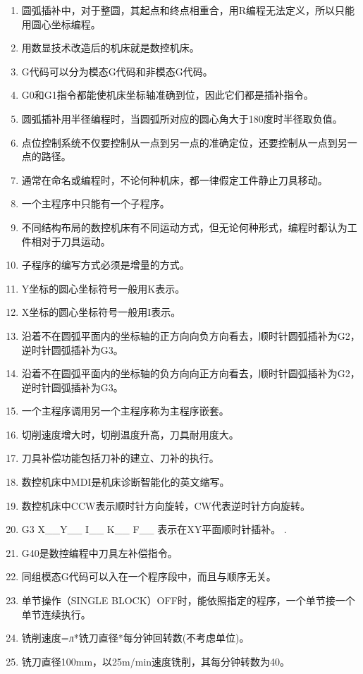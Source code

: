 \documentclass[12pt,twocolumn,landscape,UTF8,twoside]{ctexart}
\begin{document}
\begin{spacing}{1.3}
\begin{enumerate} [1、]
\item 圆弧插补中，对于整圆，其起点和终点相重合，用R编程无法定义，所以只能用圆心坐标编程。
\item 用数显技术改造后的机床就是数控机床。
\item G代码可以分为模态G代码和非模态G代码。
\item G0和G1指令都能使机床坐标轴准确到位，因此它们都是插补指令。
\item 圆弧插补用半径编程时，当圆弧所对应的圆心角大于180度时半径取负值。
\item 点位控制系统不仅要控制从一点到另一点的准确定位，还要控制从一点到另一点的路径。
\item 通常在命名或编程时，不论何种机床，都一律假定工件静止刀具移动。
\item 一个主程序中只能有一个子程序。
\item 不同结构布局的数控机床有不同运动方式，但无论何种形式，编程时都认为工件相对于刀具运动。
\item 子程序的编写方式必须是增量的方式。
\item Y坐标的圆心坐标符号一般用K表示。
\item X坐标的圆心坐标符号一般用I表示。
\item 沿着不在圆弧平面内的坐标轴的正方向向负方向看去，顺时针圆弧插补为G2，逆时针圆弧插补为G3。
\item 沿着不在圆弧平面内的坐标轴的负方向向正方向看去，顺时针圆弧插补为G2，逆时针圆弧插补为G3。
\item 一个主程序调用另一个主程序称为主程序嵌套。
\item 切削速度增大时，切削温度升高，刀具耐用度大。
\item 刀具补偿功能包括刀补的建立、刀补的执行。
\item 数控机床中MDI是机床诊断智能化的英文缩写。
\item 数控机床中CCW表示顺时针方向旋转，CW代表逆时针方向旋转。
\item G3 X\_\_Y\_\_ I\_\_ K\_\_ F\_\_ 表示在XY平面顺时针插补。
.\item G40是数控编程中刀具左补偿指令。
\item 同组模态G代码可以入在一个程序段中，而且与顺序无关。
\item 单节操作（SINGLE BLOCK）OFF时，能依照指定的程序，一个单节接一个单节连续执行。
\item 铣削速度=л*铣刀直径*每分钟回转数(不考虑单位)。
\item 铣刀直径100mm，以25m/min速度铣削，其每分钟转数为40。

\end{enumerate}
\end{spacing}
\end{document}
